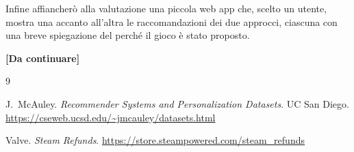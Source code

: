 \documentclass[11pt,a4paper]{article}
\begin{document}
Infine affiancherò alla valutazione una piccola web app che, scelto un utente,
mostra una accanto all'altra le raccomandazioni dei due approcci, ciascuna con
una breve spiegazione del perché il gioco è stato proposto.

\textbf{[Da continuare]}


\begin{thebibliography}{9}

J.~McAuley. \emph{Recommender Systems and Personalization Datasets}. UC San
Diego. \url{https://cseweb.ucsd.edu/~jmcauley/datasets.html}

Valve. \emph{Steam Refunds}. \url{https://store.steampowered.com/steam_refunds}

\end{thebibliography}
\end{document}

